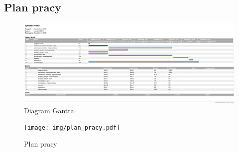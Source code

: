 \begin{landscape}

\section{Plan pracy}
\begin{figure}[!htp]
	\centering
	\includegraphics[angle=0,width=1.5\textwidth]{img/gantt.pdf}
	\caption{Diagram Gantta} 
\end{figure}
\end{landscape}

\newpage
\begin{figure}[!htp]
	\centering
	\texttt{[image: img/plan\_pracy.pdf]}
	\caption{Plan pracy} 
\end{figure}
